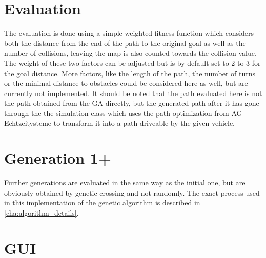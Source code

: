 \section{Evaluation} %
\label{sec:evaluation}

The evaluation is done using a simple weighted fitness function which considers both the distance from the end of the path to the original goal as well as the number of collisions, leaving the map is also counted towards the collision value. The weight of these two factors can be adjusted but is by default set to 2 to 3 for the goal distance. More factors, like the length of the path, the number of turns or the minimal distance to obstacles could be considered here as well, but are currently not implemented. It should be noted that the path evaluated here is not the path obtained from the GA directly, but the generated path after it has gone through the the simulation class which uses the path optimization from AG Echtzeitysteme to transform it into a path driveable by the given vehicle. 

\section{Generation 1+} %
\label{sec:generation_1+}

Further generations are evaluated in the same way as the initial one, but are obviously obtained by genetic crossing and not randomly. The exact process used in this implementation of the genetic algorithm is described in \ref{cha:algorithm_details}.

\section{GUI}
\label{sec:gui}

